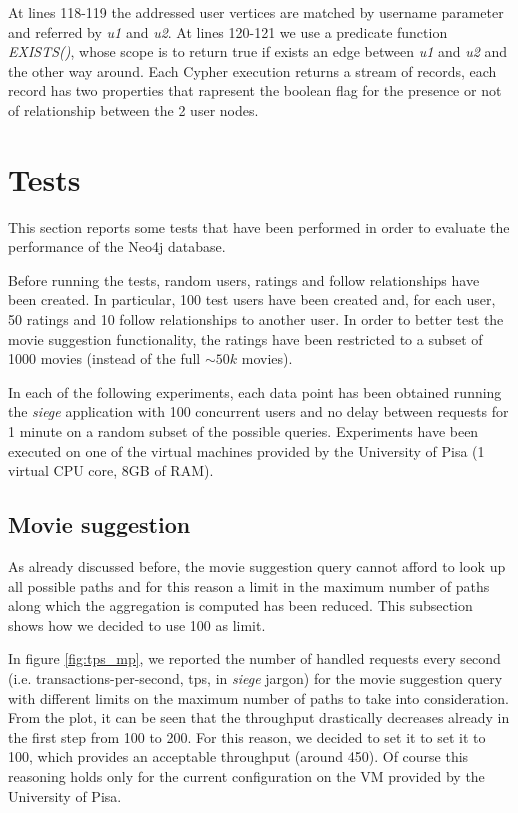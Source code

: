 \documentclass[11pt]{article}
\begin{document}


At lines 118-119 the addressed user vertices are matched by username parameter and referred by \emph{u1} and \emph{u2}.
At lines 120-121 we use a predicate function \emph{EXISTS()}, whose scope is to return true if exists an edge between \emph{u1} and \emph{u2} and the other way around.
Each Cypher execution returns a stream of records, each record has two properties that rapresent the boolean flag for the presence or not of relationship between the 2 user nodes.


\section{Tests}
This section reports some tests that have been performed in order to evaluate 
the performance of the Neo4j database.

Before running the tests, random users, ratings and follow relationships have 
been created. In particular, 100 test users have been created and, for each 
user, 50 ratings and 10 follow relationships to another user. In order to 
better test the movie suggestion functionality, the ratings have been restricted
to a subset of 1000 movies (instead of the full $\sim50k$ movies).

In each of the following experiments, each data point has been obtained running 
the \emph{siege} application with 100 concurrent users and no delay between 
requests for 1 minute on a random subset of the possible queries. Experiments 
have been executed on one of the virtual machines provided by the University 
of Pisa (1 virtual CPU core, 8GB of RAM).

\subsection{Movie suggestion}
As already discussed before, the movie suggestion query cannot afford to look
up all possible paths and for this reason a limit in the maximum number of paths
along which the aggregation is computed has been reduced. This subsection 
shows how we decided to use 100 as limit.

In figure \ref{fig:tps_mp}, we reported the number of handled requests every 
second (i.e. transactions-per-second, tps, in \emph{siege} jargon) for the 
movie suggestion query with different limits on the maximum number of paths to 
take into consideration. From the plot, it can be seen that the throughput 
drastically decreases already in the first step from 100 to 200. For this 
reason, we decided to set it to set it to 100, which provides an acceptable 
throughput (around 450). Of course this reasoning holds only for the current 
configuration on the VM provided by the University of Pisa.
\end{document}
